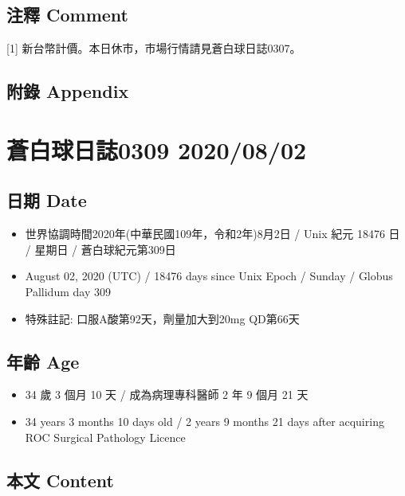 \documentclass[
]{article}
\providecommand{\tightlist}{%
  \setlength{\itemsep}{0pt}\setlength{\parskip}{0pt}}
\begin{document}
\hypertarget{ux6ce8ux91cb-comment}{%
\subsection{注釋 Comment}\label{ux6ce8ux91cb-comment}}

{[}1{]} 新台幣計價。本日休市，市場行情請見蒼白球日誌0307。

\hypertarget{ux9644ux9304-appendix}{%
\subsection{附錄 Appendix}\label{ux9644ux9304-appendix}}

\hypertarget{ux84bcux767dux7403ux65e5ux8a8c0309-20200802}{%
\section{蒼白球日誌0309
2020/08/02}\label{ux84bcux767dux7403ux65e5ux8a8c0309-20200802}}

\hypertarget{ux65e5ux671f-date-1}{%
\subsection{日期 Date}\label{ux65e5ux671f-date-1}}

\begin{itemize}
\tightlist
\item
  世界協調時間2020年(中華民國109年，令和2年)8月2日 / Unix 紀元 18476 日
  / 星期日 / 蒼白球紀元第309日
\item
  August 02, 2020 (UTC) / 18476 days since Unix Epoch / Sunday / Globus
  Pallidum day 309
\item
  特殊註記: 口服A酸第92天，劑量加大到20mg QD第66天
\end{itemize}

\hypertarget{ux5e74ux9f61-age-1}{%
\subsection{年齡 Age}\label{ux5e74ux9f61-age-1}}

\begin{itemize}
\tightlist
\item
  34 歲 3 個月 10 天 / 成為病理專科醫師 2 年 9 個月 21 天
\item
  34 years 3 months 10 days old / 2 years 9 months 21 days after
  acquiring ROC Surgical Pathology Licence
\end{itemize}

\hypertarget{ux672cux6587-content-1}{%
\subsection{本文 Content}\label{ux672cux6587-content-1}}
\end{document}
